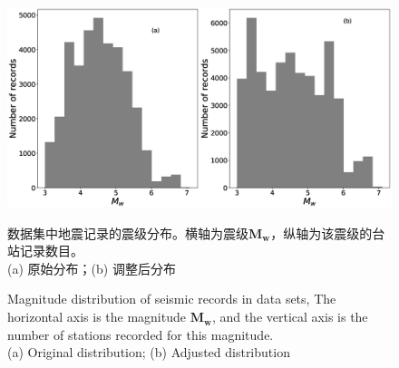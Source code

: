 \begin{figure}[!h] 
\centering 
 \includegraphics[width=0.8\linewidth]{img/5event_distribution.eps} 
 \renewcommand{\figurename}{图} 
\caption{数据集中地震记录的震级分布。横轴为震级$\mathbf{M}_{\mathbf{w}}$，纵轴为该震级的台站记录数目。\\
(a) 原始分布；(b) 调整后分布} 
\addtocounter{figure}{-1} \vspace{-5pt} 
\renewcommand{\figurename}{Fig} 
\caption{Magnitude distribution of seismic records in data sets, The horizontal axis is the magnitude $\mathbf{M}_{\mathbf{w}}$, and the vertical axis is the number of stations recorded for this magnitude.\\
(a) Original distribution; (b) Adjusted distribution
} 
\renewcommand{\figurename}{图} 
\label{fig:network-device-influence.png} 
\end{figure}